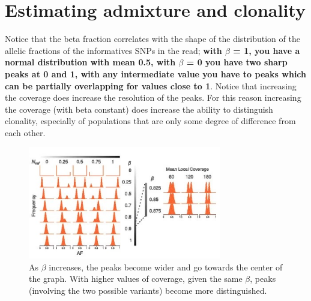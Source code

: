 \section{Estimating admixture and clonality}
  Notice that the beta fraction correlates with the shape of the distribution of
  the allelic fractions of the informatives SNPs in the read;\textbf{ with
  $\beta$ = 1, you have a normal distribution with mean 0.5, with $\beta$ = 0
  you have two sharp peaks at 0 and 1, with any intermediate value you have to
  peaks which can be partially overlapping for values close to 1}. Notice that
  increasing the coverage does increase the resolution of the peaks. For this
  reason increasing the coverage (with beta constant) does increase the ability
  to distinguish clonality, especially of populations that are only some degree
  of difference from each other.
  
  \begin{figure}[H]
    \caption{As $\beta$ increases, the peaks become wider and go towards the
    center of the graph. With higher values of coverage, given the same $\beta$,
    peaks (involving the two possible variants) become more distinguished.}
    \centering
    \includegraphics[width=0.75\textwidth]{image_02.jpg}
  \end{figure}

